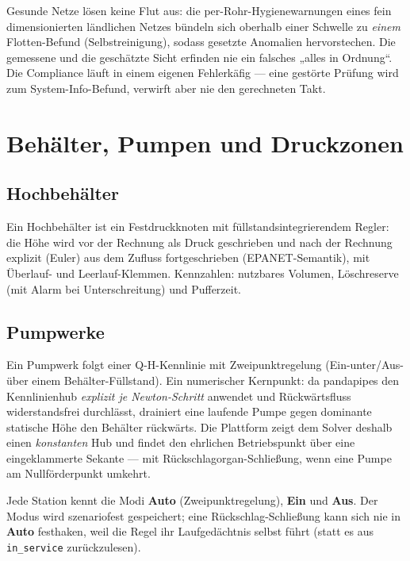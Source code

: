 \documentclass[11pt,a4paper,parskip=half]{scrreprt}
\newcommand{\ui}[1]{\textsf{\bfseries #1}}      %
\begin{document}
\begin{beispiel}
Gesunde Netze lösen keine Flut aus: die per-Rohr-Hygienewarnungen eines fein
dimensionierten ländlichen Netzes bündeln sich oberhalb einer Schwelle zu
\emph{einem} Flotten-Befund (Selbstreinigung), sodass gesetzte Anomalien
hervorstechen. Die gemessene und die geschätzte Sicht erfinden nie ein falsches
„alles in Ordnung“. Die Compliance läuft in einem eigenen Fehlerkäfig — eine
gestörte Prüfung wird zum System-Info-Befund, verwirft aber nie den gerechneten
Takt.
\end{beispiel}

\chapter{Behälter, Pumpen und Druckzonen}
\label{ch:behaelter}

\section{Hochbehälter}
Ein Hochbehälter ist ein Festdruckknoten mit füllstandsintegrierendem Regler: die
Höhe wird vor der Rechnung als Druck geschrieben und nach der Rechnung explizit
(Euler) aus dem Zufluss fortgeschrieben (EPANET-Semantik), mit Überlauf- und
Leerlauf-Klemmen. Kennzahlen: nutzbares Volumen, Löschreserve (mit Alarm bei
Unterschreitung) und Pufferzeit.

\section{Pumpwerke}
Ein Pumpwerk folgt einer Q-H-Kennlinie mit Zweipunktregelung
(Ein-unter/Aus-über einem Behälter-Füllstand). Ein numerischer Kernpunkt: da
pandapipes den Kennlinienhub \emph{explizit je Newton-Schritt} anwendet und
Rückwärtsfluss widerstandsfrei durchlässt, drainiert eine laufende Pumpe gegen
dominante statische Höhe den Behälter rückwärts. Die Plattform zeigt dem Solver
deshalb einen \emph{konstanten} Hub und findet den ehrlichen Betriebspunkt über
eine eingeklammerte Sekante — mit Rückschlagorgan-Schließung, wenn eine Pumpe am
Nullförderpunkt umkehrt.

\begin{beispiel}[Operatormodi]
Jede Station kennt die Modi \ui{Auto} (Zweipunktregelung), \ui{Ein} und
\ui{Aus}. Der Modus wird szenariofest gespeichert; eine Rückschlag-Schließung
kann sich nie in \ui{Auto} festhaken, weil die Regel ihr Laufgedächtnis selbst
führt (statt es aus \texttt{in\_service} zurückzulesen).
\end{beispiel}
\end{document}
